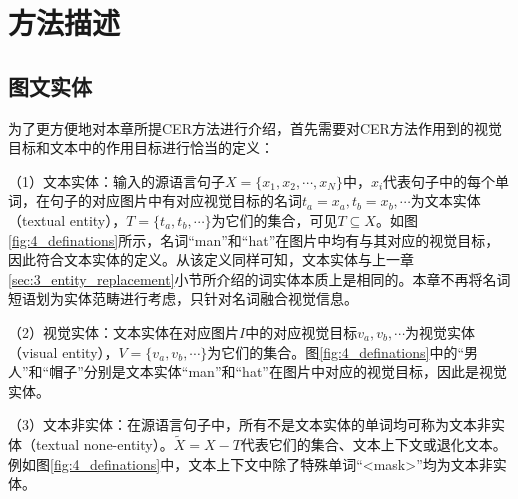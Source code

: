 \section{方法描述}

\subsection{图文实体}
\label{sec:4_entities}

为了更方便地对本章所提CER方法进行介绍，首先需要对CER方法作用到的视觉目标和文本中的作用目标进行恰当的定义：

（1）{\sffamily 文本实体：}输入的源语言句子$X=\{x_1,x_2,\cdots,x_N\}$中，$x_i$代表句子中的每个单词，在句子的对应图片中有对应视觉目标的名词$t_a=x_a,t_b=x_b,\cdots$为文本实体（textual entity），$T=\{t_a,t_b,\cdots\}$为它们的集合，可见$T \subseteq X$。如图\ref{fig:4_definations}所示，名词“man”和“hat”在图片中均有与其对应的视觉目标，因此符合文本实体的定义。从该定义同样可知，文本实体与上一章\ref{sec:3_entity_replacement}小节所介绍的词实体本质上是相同的。本章不再将名词短语划为实体范畴进行考虑，只针对名词融合视觉信息。

（2）{\sffamily 视觉实体：}文本实体在对应图片$I$中的对应视觉目标$v_a,v_b,\cdots$为视觉实体（visual entity），$V=\{v_a,v_b,\cdots\}$为它们的集合。图\ref{fig:4_definations}中的“男人”和“帽子”分别是文本实体“man”和“hat”在图片中对应的视觉目标，因此是视觉实体。

（3）{\sffamily 文本非实体：}在源语言句子中，所有不是文本实体的单词均可称为文本非实体（textual none-entity）。$\tilde{X}=X-T$代表它们的集合、文本上下文或退化文本。例如图\ref{fig:4_definations}中，文本上下文中除了特殊单词“<mask>”均为文本非实体。

%

%

